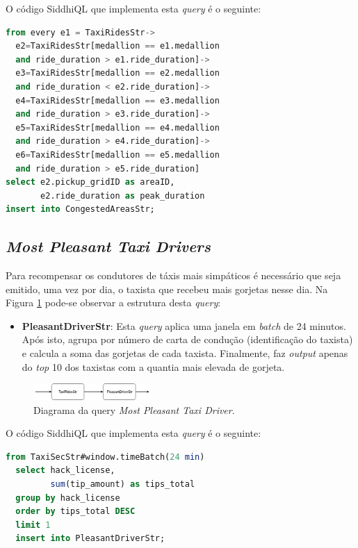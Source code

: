\documentclass[article]{IEEEtran}
\begin{document}
O código SiddhiQL que implementa esta \textit{query} é o seguinte:

\begin{lstlisting}[language=SQL]
from every e1 = TaxiRidesStr->
  e2=TaxiRidesStr[medallion == e1.medallion 
  and ride_duration > e1.ride_duration]->
  e3=TaxiRidesStr[medallion == e2.medallion 
  and ride_duration < e2.ride_duration]->
  e4=TaxiRidesStr[medallion == e3.medallion
  and ride_duration > e3.ride_duration]->
  e5=TaxiRidesStr[medallion == e4.medallion 
  and ride_duration > e4.ride_duration]->
  e6=TaxiRidesStr[medallion == e5.medallion
  and ride_duration > e5.ride_duration]
select e2.pickup_gridID as areaID, 
       e2.ride_duration as peak_duration
insert into CongestedAreasStr;
\end{lstlisting}



\subsection{\textit{Most Pleasant Taxi Drivers}}

Para recompensar os condutores de táxis mais simpáticos é necessário que seja emitido, uma vez por dia, o taxista que recebeu mais gorjetas nesse dia.
Na Figura \ref{fig:pleasantDriverDiagram} pode-se observar a estrutura desta \textit{query}:
\begin{itemize}
    \item \textbf{PleasantDriverStr}: Esta \textit{query} aplica uma janela em \textit{batch} de 24 minutos. Após isto, agrupa por número de carta de condução (identificação do taxista) e calcula a soma das gorjetas de cada taxista. Finalmente, faz \textit{output} apenas do \textit{top} 10 dos taxistas com a quantia mais elevada de gorjeta. 
\end{itemize} 

\begin{figure}[hbtp]
    \centering
    \includegraphics[width=0.4\textwidth]{images/pleasantDriver}
    \caption{Diagrama da query \textit{Most Pleasant Taxi Driver}.}
    \label{fig:pleasantDriverDiagram}
\end{figure}

O código SiddhiQL que implementa esta \textit{query} é o seguinte:

\begin{lstlisting}[language=SQL]
  from TaxiSecStr#window.timeBatch(24 min)
  select hack_license,
         sum(tip_amount) as tips_total
  group by hack_license
  order by tips_total DESC
  limit 1
  insert into PleasantDriverStr;
\end{lstlisting}
\end{document}
